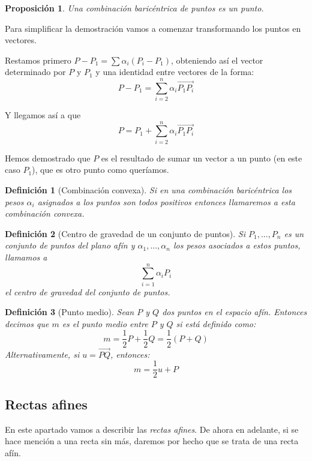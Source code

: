 \documentclass[11pt, a4paper, titlepage]{article}
\makeatletter
\renewenvironment{proof}[1][\proofname] {\vspace{-15pt}\par\pushQED{\qed}\normalfont\topsep6\p@\@plus6\p@\relax\trivlist\item[\hskip\labelsep\it#1\@addpunct{.}]\ignorespaces}{\popQED\endtrivlist\@endpefalse}
\renewenvironment{proof}[1][\proofname] {\par\pushQED{\qed}\normalfont\topsep6\p@\@plus6\p@\relax\trivlist\item[\hskip\labelsep\itshape\sffamily#1\@addpunct{.}]\ignorespaces}{\popQED\endtrivlist\@endpefalse}
\theoremstyle{theorem-style}
\newtheorem{nprop}{Proposición}[section]
\theoremstyle{definition-style}
\newtheorem{ndef}{Definición}[section]
\theoremstyle{remark-style}
\theoremstyle{example-style}
\makeatother
\begin{document}
\begin{nprop} Una combinación baricéntrica de puntos es un punto. 
\end{nprop}

\begin{proof}

  Para simplificar la demostración vamos a comenzar transformando los puntos en vectores.

  Restamos primero $P-P_1 = \sum \alpha_i(P_i-P_1)$, obteniendo así el vector determinado por $P$ y $P_1$ y una identidad entre vectores de la forma:
  \[
    P-P_1 = \sum_{i=2}^n \alpha_i \overrightarrow{P_1P_i}
  \]

  Y llegamos así a que
  \[
    P = P_1 + \sum_{i=2}^n \alpha_i \overrightarrow{P_1P_i}
  \]
  
  Hemos demostrado que $P$ es el resultado de sumar un vector a un punto (en este caso $P_1$), que es otro punto como queríamos.
\end{proof}

\begin{ndef}[Combinación convexa]
  Si en una combinación baricéntrica los pesos $\alpha_i$ asignados a los puntos son todos positivos entonces llamaremos a esta combinación \textit{convexa}. \end{ndef}

\begin{ndef}[Centro de gravedad de un conjunto de puntos]
  Si $P_1,...,P_n$ es un conjunto de puntos del plano afín y $\alpha_1,...,\alpha_n$ los \textit{pesos} asociados a estos puntos, llamamos a
  \[
    \sum_{i=1}^n \alpha_iP_i
  \]
  el \textit{centro de gravedad del conjunto de puntos}.
\end{ndef}

\begin{ndef}[Punto medio]
  Sean $P$ y $Q$ dos puntos en el espacio afín. Entonces decimos que $m$ es el punto medio entre $P$ y $Q$ si está definido como:
  \[
    m = \dfrac{1}{2} P + \dfrac{1}{2}Q = \dfrac{1}{2}(P+Q)
  \]
  Alternativamente, si $u = \overrightarrow{PQ}$, entonces:
  \[
    m = \dfrac{1}{2}u + P
  \]

\end{ndef}

\subsection{Rectas afines}

En este apartado vamos a describir las \textit{rectas afines}. De ahora en adelante, si se hace mención a una recta sin más, daremos por hecho que se trata de una recta afín.
\end{document}
